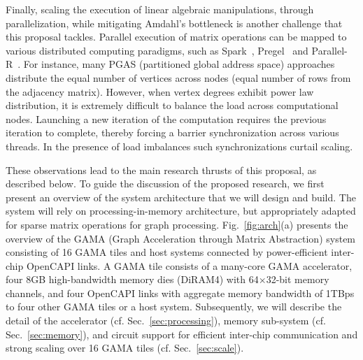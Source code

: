  
Finally, scaling the execution of linear algebraic manipulations, through parallelization, while mitigating Amdahl's bottleneck is another challenge that this proposal tackles. 
Parallel execution of matrix operations can be mapped to various distributed computing paradigms, such as Spark~\cite{zaharia2010spark, MapReduce}, Pregel~\cite{pregel, Giraph} and Parallel-R~\cite{kabacoff2015r}. 
For instance, many PGAS (partitioned global address space) approaches distribute the equal number of vertices across nodes (equal number of rows from the adjacency matrix). 
However, when vertex degrees exhibit power law distribution, it is extremely difficult to balance the load across computational nodes. 
Launching a new iteration of the computation requires the previous iteration to complete, thereby forcing a barrier synchronization across various threads. 
In the presence of load imbalances such synchronizations curtail scaling. 


These observations lead to the main research thrusts of this proposal, as described below. 
To guide the discussion of the proposed research, we first present an overview of the system architecture that we will design and build. 
The system will rely on processing-in-memory architecture, but appropriately adapted for sparse matrix operations for graph processing. 
Fig.~\ref{fig:arch}(a) presents the overview of the GAMA (Graph Acceleration through Matrix Abstraction) system consisting of 16 GAMA tiles and host systems connected by power-efficient inter-chip OpenCAPI links.
A GAMA tile consists of a many-core GAMA accelerator, four 8GB high-bandwidth memory dies (DiRAM4) with 64$\times$32-bit memory channels, 
and four OpenCAPI links with aggregate memory bandwidth of 1TBps to four other GAMA tiles or a host system.
Subsequently, we will describe the detail of the accelerator (cf. Sec.~\ref{sec:processing}),  memory sub-system (cf. Sec.~\ref{sec:memory}), and circuit support for efficient inter-chip communication and strong scaling over 16 GAMA tiles (cf. Sec.~\ref{sec:scale}).


